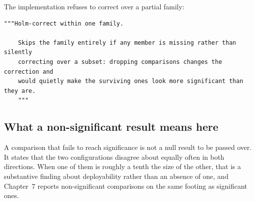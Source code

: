 The implementation refuses to correct over a partial family:

\begin{lstlisting}[caption={Refusing partial correction, \texttt{scripts/statistical\_tests.py}.},
                   label={lst:partial}]
    """Holm-correct within one family.

    Skips the family entirely if any member is missing rather than silently
    correcting over a subset: dropping comparisons changes the correction and
    would quietly make the surviving ones look more significant than they are.
    """
\end{lstlisting}

\subsection{What a non-significant result means here}

A comparison that fails to reach significance is not a null result to be passed over. It
states that the two configurations disagree about equally often in both directions. When
one of them is roughly a tenth the size of the other, that is a substantive finding about
deployability rather than an absence of one, and Chapter~7 reports non-significant
comparisons on the same footing as significant ones.
